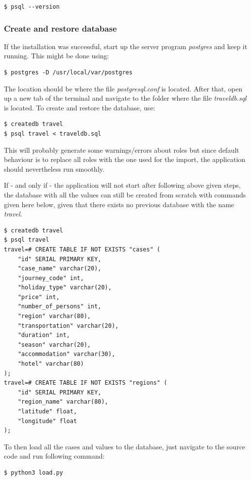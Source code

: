 \documentclass[12pt]{article}
\begin{document}
\begin{lstlisting}
$ psql --version
\end{lstlisting}

\subsubsection{Create and restore database}
\label{sec:restore}

If the installation was successful, start up the server program \textit{postgres} and keep it running. This might be done using:

\begin{lstlisting}
$ postgres -D /usr/local/var/postgres
\end{lstlisting}
The location should be where the file \textit{postgresql.conf} is located. After that, open up a new tab of the terminal and navigate to the folder where the file \textit{traveldb.sql} is located. To create and restore the database, use:

\begin{lstlisting}
$ createdb travel
$ psql travel < traveldb.sql
\end{lstlisting}
This will probably generate some warnings/errors about roles but since default behaviour is to replace all roles with the one used for the import, the application should nevertheless run smoothly.

If - and only if - the application will not start after following above given steps, the database with all the values can still be created from scratch with commands given here below, given that there exists no previous database with the name \textit{travel}.

\begin{lstlisting}
$ createdb travel
$ psql travel
travel=# CREATE TABLE IF NOT EXISTS "cases" (
	"id" SERIAL PRIMARY KEY,
	"case_name" varchar(20),
	"journey_code" int,
	"holiday_type" varchar(20),
	"price" int,
	"number_of_persons" int,
	"region" varchar(80),
	"transportation" varchar(20),
	"duration" int,
	"season" varchar(20),
	"accommodation" varchar(30),
	"hotel" varchar(80)
);
travel=# CREATE TABLE IF NOT EXISTS "regions" (
	"id" SERIAL PRIMARY KEY,
	"region_name" varchar(80),
	"latitude" float,
	"longitude" float
);
\end{lstlisting}
To then load all the cases and values to the database, just navigate to the source code and run following command:

\begin{lstlisting}
$ python3 load.py
\end{lstlisting}
\end{document}
